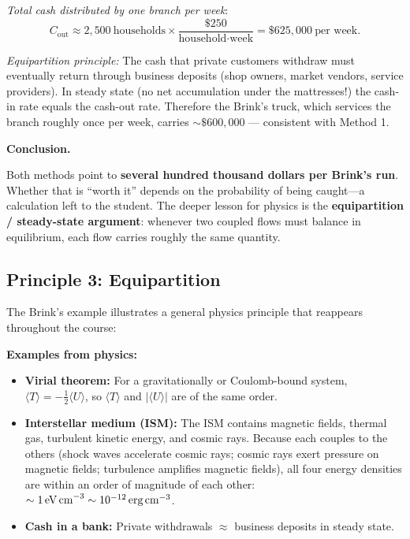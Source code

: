 {\emph{Total cash distributed by one branch per week}:
\[
  C_\text{out} \approx 2{,}500\ \text{households}\times \frac{\$250}{\text{household}\cdot\text{week}}
             = \$625{,}000\ \text{per week}.
\]

\emph{Equipartition principle:} The cash that private customers withdraw must eventually return through business deposits (shop owners, market vendors, service providers). In steady state (no net accumulation under the mattresses!) the cash-in rate equals the cash-out rate. Therefore the Brink's truck, which services the branch roughly once per week, carries $\sim \$600{,}000$ --- consistent with Method 1.

\medskip
\textbf{Conclusion.}

Both methods point to \textbf{several hundred thousand dollars per Brink's run}. Whether that is ``worth it'' depends on the probability of being caught---a calculation left to the student. The deeper lesson for physics is the \textbf{equipartition / steady-state argument}: whenever two coupled flows must balance in equilibrium, each flow carries roughly the same quantity.}

\subsection{Principle 3: Equipartition}

The Brink's example illustrates a general physics principle that reappears throughout the course:


\textbf{Examples from physics:}
\begin{itemize}
  \item \textbf{Virial theorem:} For a gravitationally or Coulomb-bound system, $\langle T \rangle = -\tfrac{1}{2}\langle U\rangle$, so $\langle T\rangle$ and $|\langle U\rangle|$ are of the same order.
  \item \textbf{Interstellar medium (ISM):} The ISM contains magnetic fields, thermal gas, turbulent kinetic energy, and cosmic rays. Because each couples to the others (shock waves accelerate cosmic rays; cosmic rays exert pressure on magnetic fields; turbulence amplifies magnetic fields), all four energy densities are within an order of magnitude of each other: $\sim 1\,\text{eV\,cm}^{-3} \sim 10^{-12}\,\text{erg\,cm}^{-3}$.
  \item \textbf{Cash in a bank:} Private withdrawals $\approx$ business deposits in steady state.
\end{itemize}

